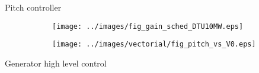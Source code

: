 \begin{frame}{Pitch controller}
  \begin{figure}
    \centering
      \centering
      \begingroup
        
      \endgroup
  \end{figure} 
  \begin{figure}
    \begin{subfigure}{0.49\textwidth}
      \centering
      \texttt{[image: ../images/fig\_gain\_sched\_DTU10MW.eps]}
    \end{subfigure}
    \begin{subfigure}{0.49\textwidth}
      \centering
      \texttt{[image: ../images/vectorial/fig\_pitch\_vs\_V0.eps]}
    \end{subfigure}
  \end{figure}

\end{frame}

\begin{frame}{Generator high level control}

  \begin{figure}
    \begin{subfigure}{\columnwidth}
      \centering
      \begingroup
        
      \endgroup
    \end{subfigure}
    \\
    \begin{subfigure}{\columnwidth}
      \centering
      \begingroup
        
      \endgroup
    \end{subfigure}
  \end{figure}

\end{frame}


